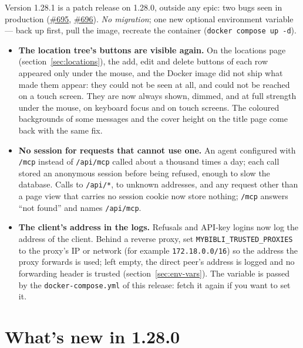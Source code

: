 Version 1.28.1 is a patch release on 1.28.0, outside any epic: two bugs
seen in production
(\href{https://github.com/guycorbaz/mybibli/issues/695}{\#695},
\href{https://github.com/guycorbaz/mybibli/issues/696}{\#696}).
\emph{No migration}; one new optional environment variable --- back up
first, pull the image, recreate the container
(\texttt{docker compose up -d}).

\begin{itemize}
  \item \textbf{The location tree's buttons are visible again.} On the
        locations page (section~\ref{sec:locations}), the add, edit and
        delete buttons of each row appeared only under the mouse, and
        the Docker image did not ship what made them appear: they could
        not be seen at all, and could not be reached on a touch screen.
        They are now always shown, dimmed, and at full strength under
        the mouse, on keyboard focus and on touch screens. The coloured
        backgrounds of some messages and the cover height on the title
        page come back with the same fix.
  \item \textbf{No session for requests that cannot use one.} An agent
        configured with \texttt{/mcp} instead of \texttt{/api/mcp}
        called about a thousand times a day; each call stored an
        anonymous session before being refused, enough to slow the
        database. Calls to \texttt{/api/*}, to unknown addresses, and
        any request other than a page view that carries no session
        cookie now store nothing; \texttt{/mcp} answers ``not found''
        and names \texttt{/api/mcp}.
  \item \textbf{The client's address in the logs.} Refusals and API-key
        logins now log the address of the client. Behind a reverse
        proxy, set \texttt{MYBIBLI\_TRUSTED\_PROXIES} to the proxy's IP
        or network (for example \texttt{172.18.0.0/16}) so the address
        the proxy forwards is used; left empty, the direct peer's
        address is logged and no forwarding header is trusted
        (section~\ref{sec:env-vars}). The variable is passed by the
        \texttt{docker-compose.yml} of this release: fetch it again if
        you want to set it.
\end{itemize}

\section{What's new in 1.28.0}\label{sec:whats-new-1.28.0}

